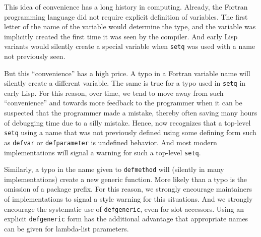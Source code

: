 This idea of convenience has a long history in computing.  Already,
the Fortran programming language did not require explicit definition
of variables.  The first letter of the name of the variable would
determine the type, and the variable was implicitly created the first
time it was seen by the compiler.  And early Lisp variants would
silently create a special variable when \texttt{setq} was used with a
name not previously seen.

But this ``convenience'' has a high price.  A typo in a Fortran
variable name will silently create a different variable.  The same is
true for a typo used in \texttt{setq} in early Lisp.  For this reason,
over time, we tend to move away from such ``convenience'' and towards
more feedback to the programmer when it can be suspected that the
programmer made a mistake, thereby often saving many hours of
debugging time due to a silly mistake.  Hence, \commonlisp{} now
recognizes that a top-level \texttt{setq} using a name that was not
previously defined using some defining form such as \texttt{defvar} or
\texttt{defparameter} is undefined behavior.  And most modern
\commonlisp{} implementations will signal a warning for such a
top-level \texttt{setq}.

Similarly, a typo in the name given to \texttt{defmethod} will
(silently in many \commonlisp{} implementations) create a new generic
function.  More likely than a typo is the omission of a package
prefix.  For this reason, we strongly encourage maintainers of
\commonlisp{} implementations to signal a style warning for this
situations.  And we strongly encourage the systematic use of
\texttt{defgeneric}, even for slot accessors.  Using an explicit
\texttt{defgeneric} form has the additional advantage that appropriate
names can be given for lambda-list parameters.


